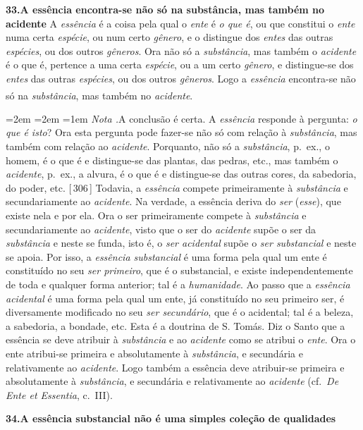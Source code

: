 \documentclass[12pt,a4paper]{article}
\newcommand{\pg}[1]{\thinspace\textup{[\,#1\,]}\thinspace}
\newcommand{\tese}[2]{\bigskip\noindent\textbf{#1.\quad #2}\;\textemdash\;}
\newcommand{\teseB}[2]{\bigskip\noindent\textbf{#1.\quad #2}\par}
\renewcommand\footnote[1]{%
    \stepcounter{footnote}\textsuperscript{\thefootnote}%
    \par
    {\footnotesize
     \leftskip=2em \rightskip=2em \parindent=1em
     \addvspace{\medskipamount}%
     \noindent\textit{Nota \thefootnote.}\enspace #1\par
     \addvspace{\medskipamount}}%
  }
\begin{document}
\tese{33}{A essência encontra-se não só na substância, mas também no acidente}
A \emph{essência} é a coisa pela qual o \emph{ente} é \emph{o que é},
\textemdash{} ou que constitui o \emph{ente} numa certa \emph{espécie}, ou num
certo \emph{gênero}, e o distingue dos \emph{entes} das outras \emph{espécies},
ou dos outros \emph{gêneros}. Ora não só a \emph{substância}, mas também o
\emph{acidente} é o que é, pertence a uma certa \emph{espécie}, ou a um certo
\emph{gênero}, e distingue-se dos \emph{entes} das outras \emph{espécies}, ou
dos outros \emph{gêneros}. Logo a \emph{essência} encontra-se não só na
\emph{substância}, mas também no \emph{acidente}.\footnote{A conclusão é certa.
A \emph{essência} responde à pergunta: \emph{o que é isto}? Ora esta pergunta
pode fazer-se não só com relação à \emph{substância}, mas também com relação ao
\emph{acidente}. Porquanto, não só a \emph{substância}, p.~ex., o homem, é o
que é e distingue-se das plantas, das pedras, etc., mas também o
\emph{acidente}, p.~ex., a alvura, é o que é e distingue-se das outras cores, da
sabedoria, do poder, etc. \pg{306} \textemdash{} Todavia, a \emph{essência}
compete primeiramente à \emph{substância} e secundariamente ao \emph{acidente}.
Na verdade, a essência deriva do \emph{ser} (\emph{esse}), que existe nela e por
ela. Ora o ser primeiramente compete à \emph{substância} e secundariamente ao
\emph{acidente}, visto que o ser do \emph{acidente} supõe o ser da
\emph{substância} e neste se funda, isto é, o \emph{ser acidental} supõe o
\emph{ser substancial} e neste se apoia. Por isso, a \emph{essência
substancial} é uma forma pela qual um ente é constituído no seu \emph{ser
primeiro}, que é o substancial, e existe independentemente de toda e qualquer
forma anterior; tal é a \emph{humanidade}. Ao passo que a \emph{essência
acidental} é uma forma pela qual um ente, já constituído no seu primeiro ser, é
diversamente modificado no seu \emph{ser secundário}, que é o acidental; tal é
a beleza, a sabedoria, a bondade, etc. \textemdash{} Esta é a doutrina de
S. Tomás. Diz o Santo que a essência se deve atribuir à \emph{substância} e ao
\emph{acidente} como se atribui o \emph{ente}. Ora o ente atribui-se primeira e
absolutamente à \emph{substância}, e secundária e relativamente ao
\emph{acidente}. Logo também a essência deve atribuir-se primeira e
absolutamente à \emph{substância}, e secundária e relativamente ao
\emph{acidente} (cf.\ \emph{De Ente et Essentia}, c.~III).}

\teseB{34}{A essência substancial não é uma simples coleção de qualidades}
\end{document}

